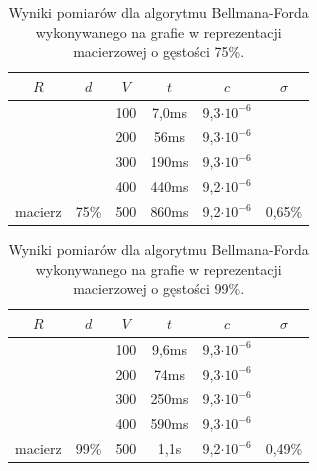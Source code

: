 \documentclass[a4paper,12pt]{article}
\begin{document}
\begin{table}[H]
	\centering
	\caption{\centering Wyniki pomiarów dla algorytmu Bellmana-Forda wykonywanego na grafie w reprezentacji macierzowej o gęstości 75\%.}
	\begin{tabular}{|c|c|c|c|c|c|}
		\hline
		\rowcolor[HTML]{C0C0C0} 
		$R$                       & $d$                    & $V$ & $t$   & $c$                & $\sigma$                 \\ \hline
		&                        & 100 & 7,0ms & 9,3$\cdot 10^{-6}$ &                          \\ \cline{3-5}
		&                        & 200 & 56ms  & 9,3$\cdot 10^{-6}$ &                          \\ \cline{3-5}
		&                        & 300 & 190ms & 9,3$\cdot 10^{-6}$ &                          \\ \cline{3-5}
		&                        & 400 & 440ms & 9,2$\cdot 10^{-6}$ &                          \\ \cline{3-5}
		\multirow{-5}{*}{macierz} & \multirow{-5}{*}{75\%} & 500 & 860ms & 9,2$\cdot 10^{-6}$ & \multirow{-5}{*}{0,65\%} \\ \hline
	\end{tabular}
\end{table}

\begin{table}[H]
	\centering
	\caption{\centering Wyniki pomiarów dla algorytmu Bellmana-Forda wykonywanego na grafie w reprezentacji macierzowej o gęstości 99\%.}
	\begin{tabular}{|c|c|c|c|c|c|}
		\hline
		\rowcolor[HTML]{C0C0C0} 
		$R$                       & $d$                    & $V$ & \multicolumn{1}{c|}{\cellcolor[HTML]{C0C0C0}$t$} & $c$                & $\sigma$                 \\ \hline
		&                        & 100 & 9,6ms                                            & 9,3$\cdot 10^{-6}$ &                          \\ \cline{3-5}
		&                        & 200 & 74ms                                             & 9,3$\cdot 10^{-6}$ &                          \\ \cline{3-5}
		&                        & 300 & 250ms                                            & 9,3$\cdot 10^{-6}$ &                          \\ \cline{3-5}
		&                        & 400 & 590ms                                            & 9,3$\cdot 10^{-6}$ &                          \\ \cline{3-5}
		\multirow{-5}{*}{macierz} & \multirow{-5}{*}{99\%} & 500 & 1,1s                                             & 9,2$\cdot 10^{-6}$ & \multirow{-5}{*}{0,49\%} \\ \hline
	\end{tabular}
\end{table}
\end{document}
